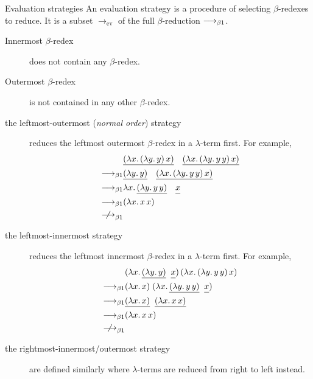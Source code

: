 \begin{frame}[allowframebreaks]{Evaluation strategies}
An evaluation strategy is a procedure of selecting $\beta$-redexes
to reduce. It is a subset $\longrightarrow_{\mathrm{ev}}$ of the full
$\beta$-reduction $\longrightarrow_{\beta1}$.

\begin{description}
  \item[Innermost $\beta$-redex] does not contain any $\beta$-redex.
  \item[Outermost $\beta$-redex] is not contained in any other $\beta$-redex.
\end{description}

\begin{description}
  \item[the leftmost-outermost (\emph{normal order}) strategy] reduces the leftmost outermost
    $\beta$-redex in a $\lambda$-term first. For example, 
    \begin{align*}
      & 
      \underline{(\lambda x.\, (\lambda y.\, y)\,x)}\quad
      \underline{(\lambda x.\, (\lambda y.\, y\,y)\,x)}
      \\
      \onereduce &
      \underline{(\lambda y.\, y)}\quad
      \underline{(\lambda x.\, (\lambda y.\, y\,y)\, x)} \\
      \onereduce &
      \lambda x.\, \underline{(\lambda y.\, y\,y)}\quad
      \underline{\vphantom{(\lambda}x} \\
      \onereduce & (\lambda x.\, x\,x) \\
      \notonereduce
    \end{align*}
  \item[the leftmost-innermost strategy] reduces the leftmost innermost
    $\beta$-redex in a $\lambda$-term first. For example, 
    \begin{align*}
      & (\lambda x.\, \underline{(\lambda y.\,
        y)}\;\;\underline{\vphantom{(\lambda} x})\,
      (\lambda x.\, (\lambda y.\, y\, y)\,x) \\
      \onereduce & (\lambda x.\,x)\;
      (\lambda x.\, \underline{(\lambda y.\, y\,
        y)}\;\;\underline{\vphantom{(\lambda}x}) \\
      \onereduce & \underline{(\lambda x.\,x)}\;\;\underline{(\lambda x.\, x\,x)} \\
      \onereduce & (\lambda x.\, x\, x) \\
      \notonereduce
    \end{align*}
  \item[the rightmost-innermost/outermost strategy]
    are defined similarly where $\lambda$-terms are reduced from right to left
    instead.
\end{description}
\end{frame}

